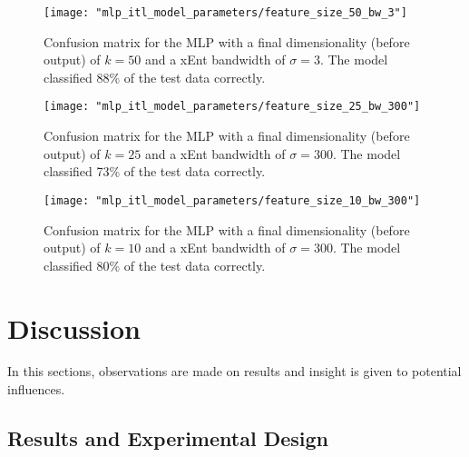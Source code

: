 \documentclass[conference]{IEEEtran}
\begin{document}
\begin{center}
	\begin{figure}[h]
		\centering
		\texttt{[image: "mlp\_itl\_model\_parameters/feature\_size\_50\_bw\_3"]}
		\caption{Confusion matrix for the MLP with a final dimensionality (before output) of $k=50$ and a xEnt bandwidth of $\sigma=3$.  The model classified 88\% of the test data correctly.}
		\label{fig:feature_size_50_bw_3}
	\end{figure}
\end{center}

\begin{center}
	\begin{figure}[h]
		\centering
		\texttt{[image: "mlp\_itl\_model\_parameters/feature\_size\_25\_bw\_300"]}
		\caption{Confusion matrix for the MLP with a final dimensionality (before output) of $k=25$ and a xEnt bandwidth of $\sigma=300$.  The model classified 73\% of the test data correctly.}
		\label{fig:feature_size_25_bw_300}
	\end{figure}
\end{center}

\begin{center}
	\begin{figure}[th]
		\centering
		\texttt{[image: "mlp\_itl\_model\_parameters/feature\_size\_10\_bw\_300"]}
		\caption{Confusion matrix for the MLP with a final dimensionality (before output) of $k=10$ and a xEnt bandwidth of $\sigma=300$.  The model classified 80\% of the test data correctly.}
		\label{fig:feature_size_10_bw_300}
	\end{figure}
\end{center}



\vspace{5cm}
\section{Discussion} \label{Discussion}
In this sections, observations are made on results and insight is given to potential influences.

\subsection{Results and Experimental Design}
\end{document}
